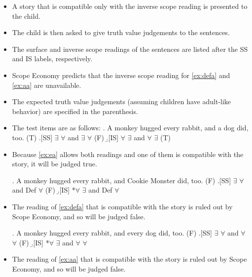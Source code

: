 \documentclass[11pt]{article}
\begin{document}
\begin{itemize}

  \item A story that is compatible only with the inverse scope reading is presented to the child.

  \item The child is then asked to give truth value judgements to the sentences.

  \item The surface and inverse scope readings of the sentences are listed after the SS and IS labels, respectively.

  \item Scope Economy predicts that the inverse scope reading for \ref{ex:defa} and \ref{ex:aa} are unavailable.

  \item The expected truth value judgements (assuming children have adult-like behavior) are specified in the parenthesis.

  \item The test items are as follows:
    \ex. \label{ex:ea} A monkey hugged every rabbit, and a dog did, too. (T)
    \a.[SS] \(∃\) \(∀\) and \(∃\) \(∀\) (F)
    \b.[IS] \(∀\) \(∃\) and \(∀\) \(∃\) (T)

  \item Because \ref{ex:ea} allows both readings and one of them is compatible with the story, it will be judged true.

    \ex. \label{ex:defa} A monkey hugged every rabbit, and Cookie Monster did, too. (F)
    \a.[SS]   \(∃\) \(∀\) and Def \(∀\) (F)
    \b.[IS] *\(∀\) \(∃\) and Def \(∀\) 

  \item The reading of \ref{ex:defa} that is compatible with the story is ruled out by Scope Economy, and so will be judged false.

    \ex. \label{ex:aa} A monkey hugged every rabbit, and every dog did, too. (F)
    \a.[SS] \(∃\) \(∀\) and \(∀\) \(∀\) (F)
    \b.[IS] *\(∀\) \(∃\) and \(∀\) \(∀\) 

  \item The reading of \ref{ex:aa} that is compatible with the story is ruled out by Scope Economy, and so will be judged false.

\end{itemize}
%
\end{document}
